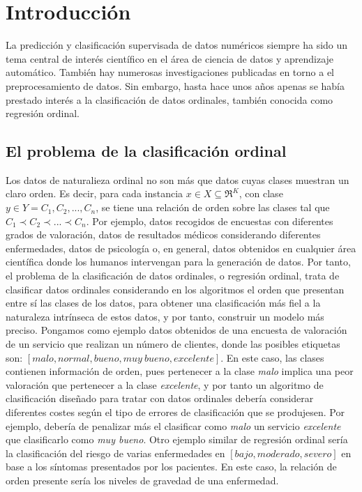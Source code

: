 \chapter{Introducción}
\label{introduction}

La predicción y clasificación supervisada de datos numéricos siempre ha sido un tema central de interés científico en el área de ciencia de datos y aprendizaje automático. También hay numerosas investigaciones publicadas en torno a el preprocesamiento de datos. Sin embargo, hasta hace unos años apenas se había prestado interés a la clasificación de datos ordinales, también conocida como regresión ordinal.

\section{El problema de la clasificación ordinal}
Los datos de naturalieza ordinal no son más que datos cuyas clases muestran un claro orden. Es decir, para cada instancia $x \in X \subseteq \Re^K $, con clase $y\in Y={C_1,C_2,...,C_n}$, se tiene una relación de orden sobre las clases tal que $C_1 \prec C_2 \prec ... \prec C_n$. Por ejemplo, datos recogidos de encuestas con diferentes grados de valoración, datos de resultados médicos considerando diferentes enfermedades, datos de psicología o, en general, datos obtenidos en cualquier área científica donde los humanos intervengan para la generación de datos. \newline
Por tanto, el problema de la clasificación de datos ordinales, o regresión ordinal, trata de clasificar datos ordinales considerando en los algoritmos el orden que presentan entre sí las clases de los datos, para obtener una clasificación más fiel a la naturaleza intrínseca de estos datos, y por tanto, construir un modelo más preciso. Pongamos como ejemplo datos obtenidos de una encuesta de valoración de un servicio que realizan un número de clientes, donde las posibles etiquetas son: \textit{$\left[malo, normal, bueno, muy\ bueno, excelente\right]$}. En este caso, las clases contienen información de orden, pues pertenecer a la clase \textit{malo} implica una peor valoración que pertenecer a la clase \textit{excelente}, y por tanto un algoritmo de clasificación diseñado para tratar con datos ordinales debería considerar diferentes costes según el tipo de errores de clasificación que se produjesen. Por ejemplo, debería de penalizar más el clasificar como \textit{malo} un servicio \textit{excelente} que clasificarlo como \textit{muy bueno}. Otro ejemplo similar de regresión ordinal sería la clasificación del riesgo de varias enfermedades en \textit{$\left[bajo, moderado, severo\right]$} en base a los síntomas presentados por los pacientes. En este caso, la relación de orden presente sería los niveles de gravedad de una enfermedad. \newline
